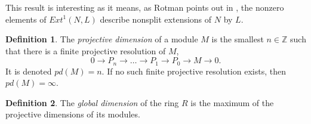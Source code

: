 \documentclass[11.5pt, twoside, a4paper, titlepage]{report}
\providecommand{\bb}[1]{\mathbb{#1}}
\theoremstyle{definition}
\newtheorem{mydef}{Definition}[section]
\theoremstyle{plain}
\begin{document}
This result is interesting as it means, as Rotman points out in \cite{Rotman}, the nonzero elements of $Ext^1(N,L)$ describe nonsplit extensions of $N$ by $L$.

\begin{mydef}
The \emph{projective dimension} of a module $M$ is the smallest $n\in \bb{Z}$ such that there is a finite projective resolution of $M$,
\begin{equation*}
0 \xrightarrow{} P_n \xrightarrow{} \dots \xrightarrow{} P_1 \xrightarrow{} P_0 \xrightarrow{} M \xrightarrow{} 0.
\end{equation*}
It is denoted $pd(M)=n$. If no such finite projective resolution exists, then $pd(M)=\infty$.
\end{mydef}

\begin{mydef}
The \emph{global dimension} of the ring $R$ is the maximum of the projective dimensions of its modules.
\end{mydef}
\end{document}
